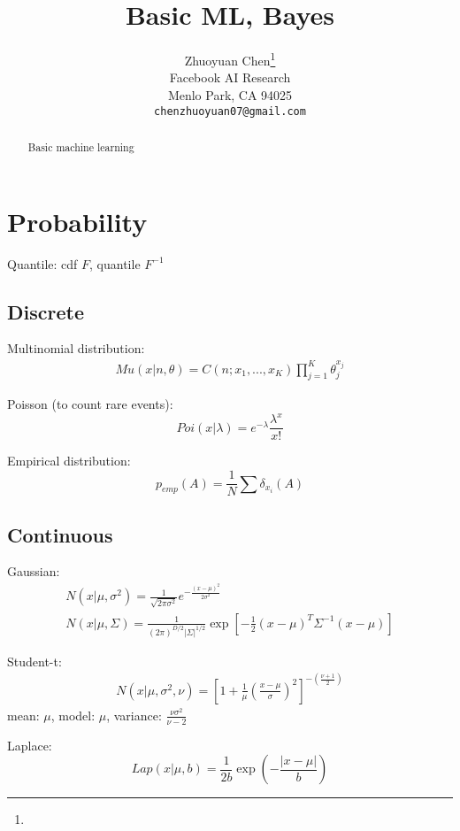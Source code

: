 \documentclass{article}
\title{Basic ML, Bayes}
\author{%
  Zhuoyuan Chen\thanks{}\\%
  Facebook AI Research\\
  Menlo Park, CA 94025 \\
  \texttt{chenzhuoyuan07@gmail.com} \\
}
\begin{document}

\maketitle

\begin{abstract}
Basic machine learning
\end{abstract}

\section{Probability}
Quantile: cdf $F$, quantile $F^{-1}$

\subsection{Discrete}
Multinomial distribution:
\begin{eqnarray*}
Mu(x|n,\theta)=C(n;x_1,...,x_K)\prod_{j=1}^K\theta_j^{x_j}
\end{eqnarray*}

Poisson (to count rare events):
\begin{equation*}
Poi(x|\lambda)=e^{-\lambda}\frac{\lambda^x}{x!}
\end{equation*}

Empirical distribution:
\begin{equation*}
p_{emp}(A)=\frac{1}{N}\sum\delta_{x_i}(A)
\end{equation*}

\subsection{Continuous}
Gaussian:
\begin{eqnarray*}
N(x|\mu,\sigma^2)=\frac{1}{\sqrt{2\pi\sigma^2}}e^{-\frac{(x-\mu)^2}{2\sigma^2}}\\
N(x|\mu,\Sigma)=\frac{1}{(2\pi)^{D/2}|\Sigma|^{1/2}}\exp[-\frac{1}{2}(x-\mu)^T\Sigma^{-1}(x-\mu)]
\end{eqnarray*}

Student-t:
\begin{eqnarray*}
N(x|\mu,\sigma^2,\nu)=[1+\frac{1}{\mu}(\frac{x-\mu}{\sigma})^2]^{-(\frac{\nu+1}{2})}
\end{eqnarray*}
mean: $\mu$, model: $\mu$, variance: $\frac{\nu\sigma^2}{\nu-2}$

Laplace:
\begin{equation*}
Lap(x|\mu,b)=\frac{1}{2b}\exp(-\frac{|x-\mu|}{b})
\end{equation*}
\end{document}
